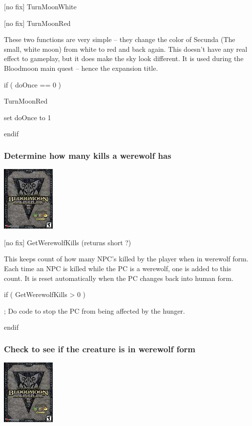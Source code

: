 {[}no fix{]} TurnMoonWhite

{[}no fix{]} TurnMoonRed

These two functions are very simple -- they change the color of Secunda
(The small, white moon) from white to red and back again. This doesn't
have any real effect to gameplay, but it does make the sky look
different. It is used during the Bloodmoon main quest -- hence the
expansion title.

if ( doOnce == 0 )

TurnMoonRed

set doOnce to 1

endif

\hypertarget{determine-how-many-kills-a-werewolf-has}{%
\subsubsection{Determine how many kills a werewolf
has}\label{determine-how-many-kills-a-werewolf-has}}

\includegraphics{media/image7.png}

{[}no fix{]} GetWerewolfKills (returns short ?)

This keeps count of how many NPC's killed by the player when in werewolf
form. Each time an NPC is killed while the PC is a werewolf, one is
added to this count. It is reset automatically when the PC changes back
into human form.

if ( GetWerewolfKills > 0 )

; Do code to stop the PC from being affected by the hunger.

endif

\hypertarget{check-to-see-if-the-creature-is-in-werewolf-form}{%
\subsubsection{Check to see if the creature is in werewolf
form}\label{check-to-see-if-the-creature-is-in-werewolf-form}}

\includegraphics{media/image7.png}

